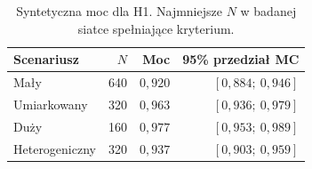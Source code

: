 \begin{table}[htbp]\centering
\caption{Syntetyczna moc dla H1. Najmniejsze $N$ w badanej siatce spełniające kryterium.}
\begin{tabular}{lrrr}\toprule
Scenariusz & $N$ & Moc & 95\% przedział MC \\ \midrule
Mały & 640 & $0{,}920$ & $[0{,}884;\ 0{,}946]$ \\
Umiarkowany & 320 & $0{,}963$ & $[0{,}936;\ 0{,}979]$ \\
Duży & 160 & $0{,}977$ & $[0{,}953;\ 0{,}989]$ \\
Heterogeniczny & 320 & $0{,}937$ & $[0{,}903;\ 0{,}959]$ \\
\bottomrule\end{tabular}\end{table}
